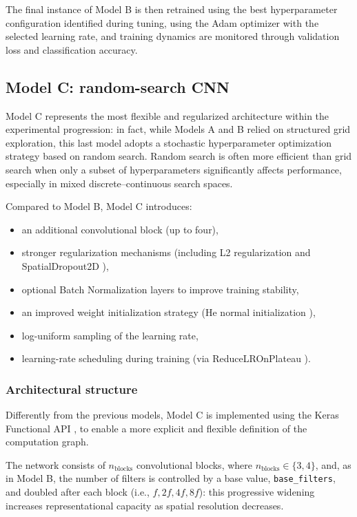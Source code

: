 \documentclass[11pt,a4paper]{article}
\begin{document}
The final instance of Model B is then retrained using the best hyperparameter configuration identified during tuning, using the Adam optimizer with the selected learning rate, and training dynamics are monitored through validation loss and classification accuracy.


\subsection{Model C: random-search CNN}

Model C represents the most flexible and regularized architecture within the experimental progression: in fact, while Models A and B relied on structured grid exploration, this last model adopts a stochastic hyperparameter optimization strategy based on random search.  
Random search is often more efficient than grid search when only a subset of hyperparameters significantly affects performance, especially in mixed discrete–continuous search spaces.

Compared to Model B, Model C introduces:
\begin{itemize}
    \item an additional convolutional block (up to four),
    \item stronger regularization mechanisms (including L2 regularization \cite{keras_l2_regularizer} and SpatialDropout2D \cite{keras_spatial_dropout2d}),
    \item optional Batch Normalization \cite{keras_batch_normalization} layers to improve training stability,
    \item an improved weight initialization strategy (He normal initialization \cite{he_initialization}),
    \item log-uniform sampling of the learning rate,
    \item learning-rate scheduling during training (via ReduceLROnPlateau \cite{keras_reduce_lr_on_plateau,keras_reduce_lr_on_plateau_tf}).
\end{itemize}


\subsubsection{Architectural structure}

Differently from the previous models, Model C is implemented using the Keras Functional API \cite{keras_functional_api}, to enable a more explicit and flexible definition of the computation graph.

The network consists of $n_{\text{blocks}}$ convolutional blocks, where $n_{\text{blocks}} \in \{3,4\}$, and, as in Model B, the number of filters is controlled by a base value, \texttt{base\_filters}, and doubled after each block (i.e., $f, 2f, 4f, 8f$): this progressive widening increases representational capacity as spatial resolution decreases.
\end{document}
